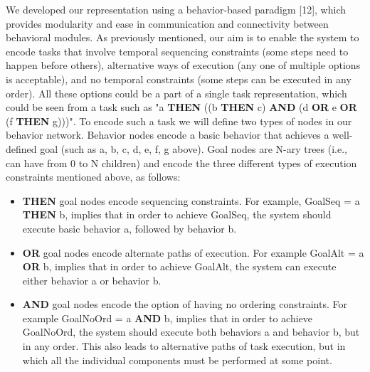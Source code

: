 \documentclass[letterpaper, 10 pt, conference]{ieeeconf}  %
\begin{document}
We developed our representation using a behavior-based paradigm [12], which provides modularity and ease in communication and connectivity between behavioral modules.  As previously mentioned, our aim is to enable the system to encode tasks that involve temporal sequencing constraints (some steps need to happen before others), alternative ways of execution (any one of multiple options is acceptable), and no temporal constraints (some steps can be executed in any order). All these options could be a part of a single task representation, which could be seen from a task such as "a {\bf THEN} ((b {\bf THEN} c) {\bf AND} (d {\bf OR} e {\bf OR} (f {\bf THEN} g)))". To encode such a task we will define two types of nodes in our behavior network. Behavior nodes encode a basic behavior that achieves a well-defined goal (such as a, b, c, d, e, f, g above). Goal nodes are N-ary trees (i.e., can have from 0 to N children) and encode the three different types of execution constraints mentioned above, as follows:
\begin{itemize}

\item {\bf THEN} goal nodes encode sequencing constraints. For example, GoalSeq = a {\bf THEN} b, implies that in order to achieve GoalSeq, the system should execute basic behavior a, followed by behavior b.

\item {\bf OR} goal nodes encode alternate paths of execution. For example GoalAlt = a {\bf OR} b, implies that in order to achieve GoalAlt, the system can execute either behavior a or behavior b.

\item {\bf AND} goal nodes encode the option of having no ordering constraints. For example GoalNoOrd = a {\bf AND} b, implies that in order to achieve GoalNoOrd, the system should execute both behaviors a and behavior b, but in any order. This also leads to alternative paths of task execution, but in which all the individual components must be performed at some point.

\end{itemize}
\end{document}
